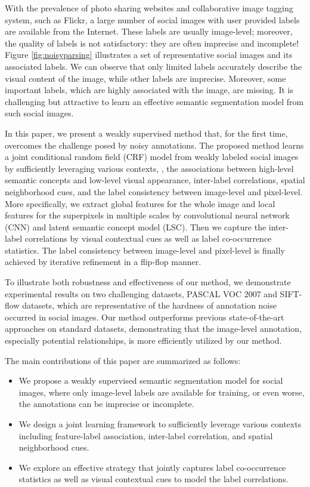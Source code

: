 With the prevalence of photo sharing websites and collaborative image tagging system, such as Flickr, a large number of social images with user provided labels are available from the Internet.
These labels are usually image-level; moreover, the quality of labels is not satisfactory: they are often imprecise and incomplete!
Figure \ref{fig:noisyparsing} illustrates a set of representative social images and its associated labels.
We can observe that only limited labels accurately describe the visual content of the image, while other labels are imprecise.
Moreover, some important labels, which are highly associated with the image, are missing.
It is challenging but attractive to learn an effective semantic segmentation model from such social images.

In this paper, we present a weakly supervised method that, for the first time, overcomes the challenge posed by noisy annotations.
The proposed method learns a joint conditional random field (CRF) model from weakly labeled social images by sufficiently leveraging various contexts, \eg, the associations between high-level semantic concepts and low-level visual appearance, inter-label correlations, spatial neighborhood cues, and the label consistency between image-level and pixel-level.
More specifically, we extract global features for the whole image and local features for the superpixels in multiple scales by convolutional neural network (CNN) and latent semantic concept model (LSC).
Then we capture the inter-label correlations by visual contextual cues as well as label co-occurrence statistics.
The label consistency between image-level and pixel-level is finally achieved by iterative refinement in a flip-flop manner.

To illustrate both robustness and effectiveness of our method, we demonstrate experimental results on two challenging datasets, PASCAL VOC 2007 and SIFT-flow datasets, which are representative of the hardness of annotation noise occurred in social images.
Our method outperforms previous state-of-the-art approaches on standard datasets, demonstrating that the image-level annotation, especially potential relationships, is more efficiently utilized by our method. 

The main contributions of this paper are summarized as follows:
\begin{itemize}
  \item We propose a weakly supervised semantic segmentation model for social images, where only image-level labels are available for training, or even worse, the annotations can be imprecise or incomplete. 
  \item We design a joint learning framework to sufficiently leverage various contexts including feature-label association, inter-label correlation, and spatial neighborhood cues.
  \item We explore an effective strategy that jointly captures label co-occurrence statistics as well as visual contextual cues to model the label correlations.
\end{itemize}
